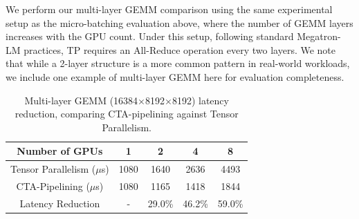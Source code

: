 


We perform our multi-layer GEMM comparison using the same experimental setup as the micro-batching evaluation above, where the number of GEMM layers increases with the GPU count. Under this setup, following standard Megatron-LM practices, TP requires an All-Reduce operation every two layers. We note that while a 2-layer structure is a more common pattern in real-world workloads, we include one example of multi-layer GEMM here for evaluation completeness. 

\begin{table}
    \centering
    \small
    \caption{Multi-layer GEMM (16384$\times$8192$\times$8192) latency reduction, comparing CTA-pipelining against Tensor Parallelism.}
    \label{tab:tp-speedup}
    \begin{tabular}{|c|c|c|c|c|}
        \hline
        Number of GPUs & 1 & 2 & 4 & 8 \\
        \hline
        Tensor Parallelism ($\mu$s) & 1080 & 1640 & 2636 & 4493 \\ 
        \hline
        CTA-Pipelining ($\mu$s) & 1080 & 1165 & 1418 & 1844 \\ 
        \hline
        Latency Reduction & - & 29.0\% & 46.2\% & 59.0\% \\ 
        \hline
    \end{tabular}
    \vspace{-3mm}
\end{table} 


